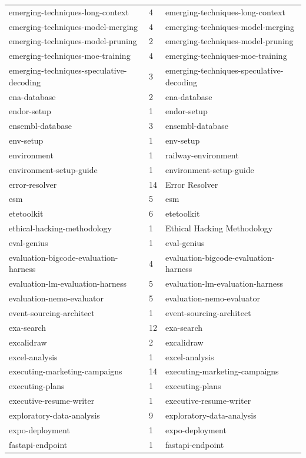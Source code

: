 \begin{longtable}{@{}lll@{}}
emerging-techniques-long-context & 4 & emerging-techniques-long-context\\
emerging-techniques-model-merging & 4 & emerging-techniques-model-merging\\
emerging-techniques-model-pruning & 2 & emerging-techniques-model-pruning\\
emerging-techniques-moe-training & 4 & emerging-techniques-moe-training\\
emerging-techniques-speculative-decoding & 3 & emerging-techniques-speculative-decoding\\
ena-database & 2 & ena-database\\
endor-setup & 1 & endor-setup\\
ensembl-database & 3 & ensembl-database\\
env-setup & 1 & env-setup\\
environment & 1 & railway-environment\\
environment-setup-guide & 1 & environment-setup-guide\\
error-resolver & 14 & Error Resolver\\
esm & 5 & esm\\
etetoolkit & 6 & etetoolkit\\
ethical-hacking-methodology & 1 & Ethical Hacking Methodology\\
eval-genius & 1 & eval-genius\\
evaluation-bigcode-evaluation-harness & 4 & evaluation-bigcode-evaluation-harness\\
evaluation-lm-evaluation-harness & 5 & evaluation-lm-evaluation-harness\\
evaluation-nemo-evaluator & 5 & evaluation-nemo-evaluator\\
event-sourcing-architect & 1 & event-sourcing-architect\\
exa-search & 12 & exa-search\\
excalidraw & 2 & excalidraw\\
excel-analysis & 1 & excel-analysis\\
executing-marketing-campaigns & 14 & executing-marketing-campaigns\\
executing-plans & 1 & executing-plans\\
executive-resume-writer & 1 & executive-resume-writer\\
exploratory-data-analysis & 9 & exploratory-data-analysis\\
expo-deployment & 1 & expo-deployment\\
fastapi-endpoint & 1 & fastapi-endpoint\\

\end{longtable}
